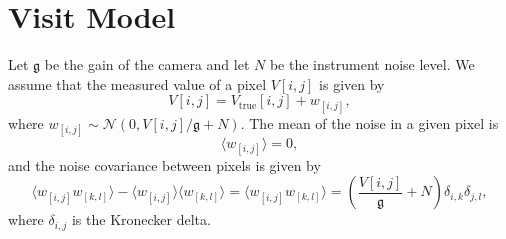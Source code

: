 \documentclass[times]{aastex6}
\begin{document}
\medskip

\section{Visit Model}
Let $\mathfrak{g}$ be the gain of the camera and let $N$ be the instrument noise level. We assume that the measured value of a pixel $V[i,j]$ is given by
\begin{equation}\label{eq:PixelModel}
  V[i,j] = V_{\mathrm{true}}[i,j] + w_{[i,j]},
\end{equation}
where $w_{[i,j]} \sim \mathcal{N}(0, V[i,j]/\mathfrak{g} + N)$.
The mean of the noise in a given pixel is
\begin{equation}\label{eq:NoiseMean}
  \langle w_{[i,j]} \rangle = 0,
\end{equation}
and the noise covariance between pixels is given by
\begin{equation}\label{eq:NoiseCovariance}
  \langle w_{[i,j]}w_{[k,l]} \rangle - \langle w_{[i,j]} \rangle \langle w_{[k,l]} \rangle = \langle w_{[i,j]}w_{[k,l]} \rangle = \left ( \frac{V[i,j]}{\mathfrak{g}} + N \right )\delta_{i,k}\delta_{j,l},
\end{equation}
where $\delta_{i,j}$ is the Kronecker delta.
\end{document}
